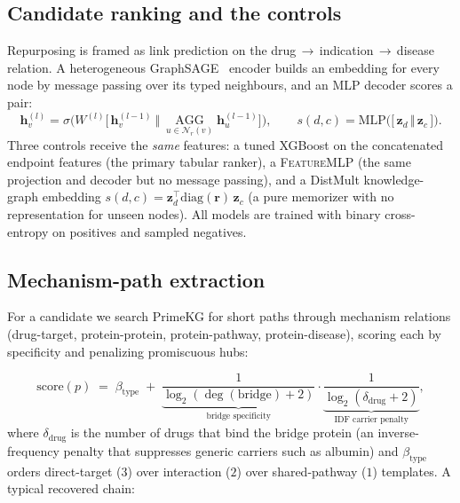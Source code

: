 \documentclass[11pt]{article}
\newcommand{\NN}{\mathcal{N}}
\newcommand{\zd}{\mathbf{z}}
\begin{document}
\subsection{Candidate ranking and the controls}
Repurposing is framed as link prediction on the drug\,$\to$\,indication\,$\to$\,disease
relation. A heterogeneous GraphSAGE~\cite{sage} encoder builds an embedding for every
node by message passing over its typed neighbours, and an MLP decoder scores a pair:
\begin{equation}
\mathbf{h}_v^{(l)} = \sigma\!\Big( W^{(l)}\big[\,\mathbf{h}_v^{(l-1)}\ \big\Vert\
\textstyle\operatorname*{AGG}_{u\in\NN_r(v)} \mathbf{h}_u^{(l-1)}\big]\Big),
\qquad
s(d,c) = \mathrm{MLP}\big(\big[\,\zd_d \,\Vert\, \zd_c\,\big]\big).
\label{eq:gnn}
\end{equation}
Three controls receive the \emph{same} features: a tuned XGBoost on the concatenated
endpoint features (the primary tabular ranker), a \textsc{FeatureMLP} (the same projection
and decoder but no message passing), and a DistMult knowledge-graph embedding
$s(d,c)=\zd_d^\top \mathrm{diag}(\mathbf{r})\,\zd_c$ (a pure memorizer with no
representation for unseen nodes). All models are trained with binary cross-entropy on
positives and sampled negatives.

\subsection{Mechanism-path extraction}
\begin{sloppypar}
For a candidate we search PrimeKG for short paths through mechanism relations
(drug-target, protein-protein, protein-pathway, protein-disease), scoring each by
specificity and penalizing promiscuous hubs:
\end{sloppypar}
\begin{equation}
\mathrm{score}(p) \;=\; \beta_{\text{type}} \;+\;
\underbrace{\frac{1}{\log_2(\deg(\text{bridge})+2)}}_{\text{bridge specificity}}\cdot
\underbrace{\frac{1}{\log_2(\delta_{\text{drug}}+2)}}_{\text{IDF carrier penalty}},
\label{eq:mech}
\end{equation}
where $\delta_{\text{drug}}$ is the number of drugs that bind the bridge protein (an
inverse-frequency penalty that suppresses generic carriers such as albumin) and
$\beta_{\text{type}}$ orders direct-target ($3$) over interaction ($2$) over
shared-pathway ($1$) templates. A typical recovered chain:
\end{document}
